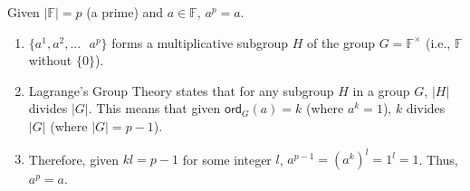 \begin{tcolorbox}[title={\textbf{\tboxtheorem{\ref*{subsec:order-theorem}.4} Fermat's Little Theorem}}]
Given $|\mathbb{F}| = p$ (a prime) and $a \in \mathbb{F}$, $a^p = a$.
\end{tcolorbox}
\begin{myproof}
    \begin{enumerate}
    \item $\{a^1, a^2, ... \text{ } a^p\}$ forms a multiplicative subgroup $H$ of the group $G = \mathbb{F^{\times}}$ (i.e., $\mathbb{F}$ without $\{0\}$). 
    \item Lagrange's Group Theory states that for any subgroup $H$ in a group $G$, $|H|$ divides $|G|$. This means that given $\textsf{ord}_G(a) = k$ (where $a^k = 1$), $k$ divides $|G|$ (where $|G| = p - 1$). 
    \item Therefore, given $kl = p - 1$ for some integer $l$, $a^{p-1} = (a^k)^l = 1^l = 1$. Thus, $a^p = a$.
    \end{enumerate}
\end{myproof}